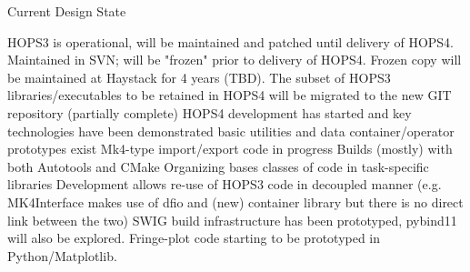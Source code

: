 \documentclass[8pt]{beamer}
\begin{document}
\begin{frame}{Current Design State}


    \begin{outline}
    \1 HOPS3 is operational, will be maintained and patched until delivery of HOPS4.
        \2 Maintained in SVN; will be "frozen" prior to delivery of HOPS4. Frozen copy will be maintained at Haystack for 4 years (TBD).
        \2 The subset of HOPS3 libraries/executables to be retained in HOPS4 will be migrated to the new GIT repository (partially complete)
    \1 HOPS4 development has started and key technologies have been demonstrated
        \2 basic utilities and data container/operator prototypes exist
        \2 Mk4-type import/export code in progress 
        \2 Builds (mostly) with both Autotools and CMake
        \2 Organizing bases classes of code in task-specific libraries
        \2 Development allows re-use of HOPS3 code in decoupled manner (e.g. MK4Interface makes use of dfio and (new) container library but there is no direct link between the two)
        \2 SWIG build infrastructure has been prototyped, pybind11 will also be explored.
        \2 Fringe-plot code starting to be prototyped in Python/Matplotlib.
    \end{outline}
\end{frame}
\end{document}
